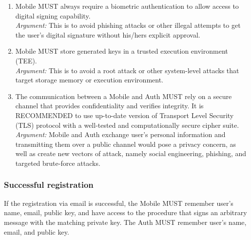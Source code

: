 \begin{enumerate}
                \item Mobile MUST always require a biometric authentication to allow access to digital signing 
                      capability.\\        
                \textit{Argument:} This is to avoid phishing attacks or other illegal attempts to get the user's 
                                   digital signature without his/hers explicit approval.

                \item Mobile MUST store generated keys in a trusted execution environment (TEE).\\        
                \textit{Argument:} This is to avoid a root attack or other system-level attacks that target storage 
                                    memory or execution environment.

                \item The communication between a Mobile and Auth MUST rely on a secure channel that provides 
                      confidentiality and verifies integrity. It is RECOMMENDED to use up-to-date version of 
                      Transport Level Security (TLS) protocol with a well-tested and computationally secure 
                      cipher suite.\\      
                \textit{Argument:} Mobile and Auth exchange user's personal information and transmitting them over a 
                                   public channel would pose a privacy concern, as well as create new vectors of attack, 
                                   namely social engineering, phishing, and targeted brute-force attacks.
            \end{enumerate}
        
            \subsubsection{Successful registration}
            If the registration via email is successful, the Mobile MUST remember user's name, email, public key, and 
            have access to the procedure that signs an arbitrary message with the matching private key. The Auth MUST 
            remember user's name, email, and public key.

